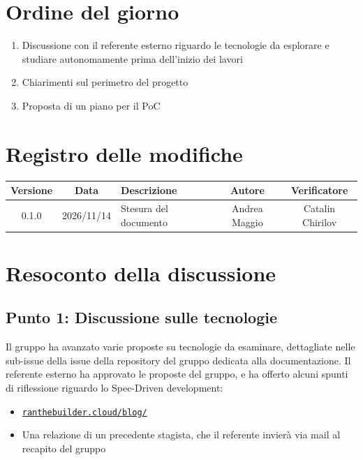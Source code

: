 \documentclass[a4paper, 11pt]{article}
\begin{document}
\section*{Ordine del giorno}
\begin{enumerate}
    \item Discussione con il referente esterno riguardo le tecnologie da esplorare e studiare autonomamente prima dell'inizio dei lavori\vspace{-0.2cm}
    \item Chiarimenti sul perimetro del progetto \vspace{-0.2cm}
    \item Proposta di un piano per il PoC \vspace{-0.2cm}
\end{enumerate}
\vspace{-0.5cm}

\section*{Registro delle modifiche}
\begin{tabularx}{\textwidth}{|c|c|X|c|c|}
    \hline
    \textbf{Versione} & \textbf{Data} & \textbf{Descrizione} & \textbf{Autore} & \textbf{Verificatore} \\ \hline
    0.1.0 & 2026/11/14 & Stesura del documento & Andrea Maggio & Catalin Chirilov \\ \hline
\end{tabularx}

\newpage
\tableofcontents
\newpage


\section{Resoconto della discussione}

\subsection{Punto 1: Discussione sulle tecnologie}
Il gruppo ha avanzato varie proposte su tecnologie da esaminare, dettagliate nelle sub-issue della issue  della repository del gruppo dedicata alla documentazione. Il referente esterno ha approvato le proposte del gruppo, e ha offerto alcuni spunti di riflessione riguardo lo Spec-Driven development:
\begin{itemize}
    \item \href{https://ranthebuilder.cloud/blog/i-tested-three-spec-driven-ai-tools-here-s-my-honest-take}{\texttt{ranthebuilder.cloud/blog/}} \vspace{-0.2cm}
    \item Una relazione di un precedente stagista, che il referente invierà via mail al recapito del gruppo\vspace{-0.2cm}
\end{itemize}
\end{document}
